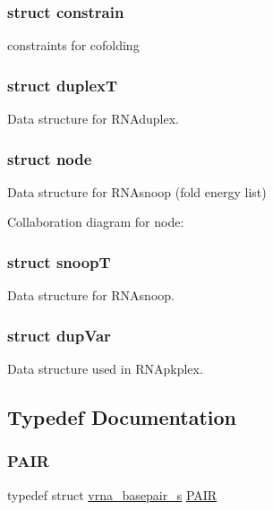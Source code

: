 \subsubsection{struct constrain}
constraints for cofolding \label{structduplexT}
\subsubsection{struct duplexT}
Data structure for R\+N\+Aduplex. \label{structnode}
\subsubsection{struct node}
Data structure for R\+N\+Asnoop (fold energy list) 

Collaboration diagram for node\+:
\label{structsnoopT}
\subsubsection{struct snoopT}
Data structure for R\+N\+Asnoop. \label{structdupVar}
\subsubsection{struct dup\+Var}
Data structure used in R\+N\+Apkplex. 

\subsection{Typedef Documentation}
\mbox{\label{group__data__structures_ga4381025ffbd692e54189b2c679c79c99}} 
\subsubsection{\texorpdfstring{PAIR}{PAIR}}
{\footnotesize\ttfamily typedef struct \mbox{\hyperlink{group__data__structures_structvrna__basepair__s}{vrna\+\_\+basepair\+\_\+s}} \mbox{\hyperlink{group__data__structures_ga4381025ffbd692e54189b2c679c79c99}{P\+A\+IR}}}



